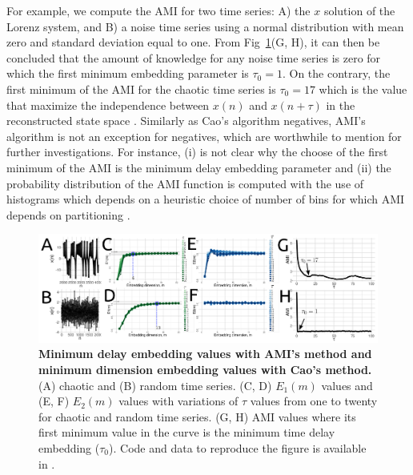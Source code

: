 \documentclass[fleqn,10pt]{wlscirep}
\begin{document}
For example, we compute the AMI for two time series:
A) the $x$ solution of the Lorenz system, and
B) a noise time series using a normal distribution with mean zero and 
standard deviation equal to one. From Fig~\ref{fig:caoami}(G, H), it can then be 
concluded that the amount of knowledge for any noise time series is zero 
for which the first minimum embedding parameter is $\tau_0=1$. 
On the contrary, the first minimum of the AMI for the chaotic time series 
is $\tau_0=17$ which is the value that maximize the independence 
between $x(n)$ and $x(n+\tau)$ in the reconstructed state space 
\cite{bradley2015}.
Similarly as Cao's algorithm negatives, AMI's algorithm is not an
exception for negatives, which are worthwhile to mention for further 
investigations.
For instance, (i) is not clear why the choose of the first minimum of the AMI 
is the minimum delay embedding parameter \cite{kantz2003} and 
(ii) the probability distribution of the AMI function is computed
with the use of histograms which depends on a heuristic choice of number of bins
for which AMI depends on partitioning \cite{garcia2005e71}.

\begin{figure}[ht]
\centering
\includegraphics[width=1.0\textwidth]{fig-caoami.pdf}
    \caption{
	{\bf Minimum delay embedding values with AMI's method and minimum dimension embedding values with Cao's method.} 
	(A) chaotic and (B) random time series.
	(C, D) $E_1 (m)$ values and (E, F) $E_2(m)$ values 
	with variations of $\tau$ values from one to twenty
	for chaotic and random time series.
	(G, H) AMI values where its first minimum value in the curve
	is the minimum time delay embedding ($\tau_0$).
	Code and data to reproduce the figure is available in \cite{srep2020}.
        }
    \label{fig:caoami}
\end{figure}


\end{document}
